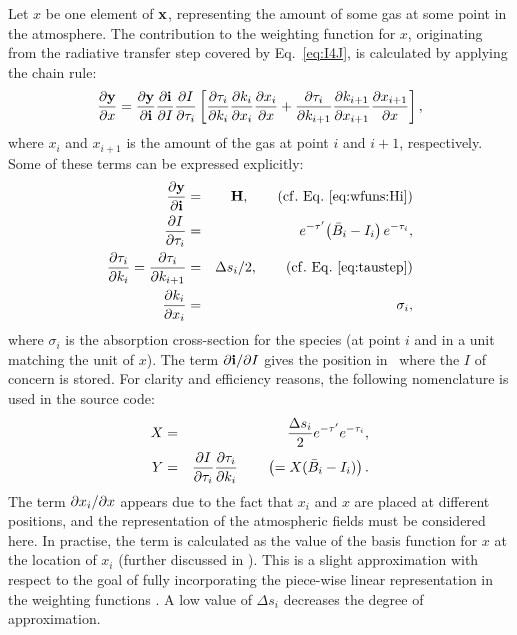 Let $x$ be one element of $\mathbf{x}$, representing the amount of
some gas at some point in the atmosphere. The contribution to the weighting
function for $x$, originating from the radiative transfer step covered by
Eq.~\ref{eq:I4J}, is calculated by applying the chain rule:
\begin{equation}
  \label{eq:chainrule}
  \frac{\partial \mathbf{y}}{\partial x} =  
  \frac{\partial \mathbf{y}}{\partial \mathbf{i}}
  \frac{\partial \mathbf{i}}{\partial I} \frac{\partial I}{\partial \tau_{i}}
  \left[\frac{\partial \tau_{i}}{\partial k_i}\frac{\partial k_i}{\partial x_i} 
        \frac{\partial x_i}{\partial x} +
        \frac{\partial \tau_{i}}{\partial k_{i+1}}\frac{\partial k_{i+1}}{\partial x_{i+1}}
        \frac{\partial x_{i+1}}{\partial x} \right],
\end{equation}
where $x_i$ and $x_{i+1}$ is the amount of the gas at point $i$ and $i+1$,
respectively. Some of these terms can be expressed explicitly:
\begin{eqnarray}
  \frac{\PartD \MsrVct}{\PartD \MpiVct} &=& \SnsMtr,
               \qquad \mathrm{(cf.\ Eq.\ \ref{eq:wfuns:Hi})} \\
  \frac{\PartD I}{\PartD \aOth{i}} 
      &=& e^{-\Oth'}\!\left( \bar{B}_i-I_i\right)e^{-\aOth{i}}, \\
  \frac{\PartD \aOth{i}}{\PartD k_i}=\frac{\PartD \aOth{i}}{\PartD k_{i+1}} 
      &=& \Delta s_i/2, \qquad \mathrm{(cf.\ Eq.\ \ref{eq:taustep})} \\
  \frac{\PartD k_i}{\PartD x_i}
      &=& \sigma_i, 
\end{eqnarray}
where $\sigma_i$ is the absorption cross-section for the species (at point $i$
and in a unit matching the unit of $x$). The term $\partial \mathbf{i}/\partial I$
gives the position in \MpiVct\ where the $I$ of concern is stored. For clarity
and efficiency reasons, the following nomenclature is used in the source code:
\begin{eqnarray}
  X &=& \frac{\Delta s_i}{2} e^{-\tau'} e^{-\tau_{i}}, \\
  Y &=& \frac{\partial I}{\partial \tau_{i}}\frac{\partial \tau_{i}}{\partial k_i}
    \qquad \left( = X(\bar{B}_i-I_i) \right).
\end{eqnarray}
The term $\partial x_i/\partial x$ appears due to the fact that $x_i$ and $x$ are
placed at different positions, and the representation of the atmospheric fields
must be considered here. In practise, the term is calculated as the value of
the basis function for $x$ at the location of $x_i$ (further discussed in
\citet{buehler:artst:05}). This is a slight approximation with respect to the
goal of fully incorporating the piece-wise linear representation in the
weighting functions \citep{buehler:artst:05}. A low value of $\Delta s_i$
decreases the degree of approximation.

